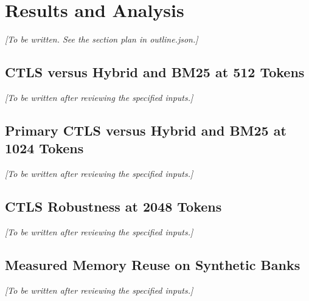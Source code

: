 \section{Results and Analysis}
\label{sec:results}
\textit{[To be written. See the section plan in outline.json.]}
\subsection{CTLS versus Hybrid and BM25 at 512 Tokens}
\label{sec:result_fair_baselines_512}
\textit{[To be written after reviewing the specified inputs.]}
\subsection{Primary CTLS versus Hybrid and BM25 at 1024 Tokens}
\label{sec:result_fair_baselines}
\textit{[To be written after reviewing the specified inputs.]}
\subsection{CTLS Robustness at 2048 Tokens}
\label{sec:result_protocol_replication}
\textit{[To be written after reviewing the specified inputs.]}
\subsection{Measured Memory Reuse on Synthetic Banks}
\label{sec:result_memory_reuse}
\textit{[To be written after reviewing the specified inputs.]}
